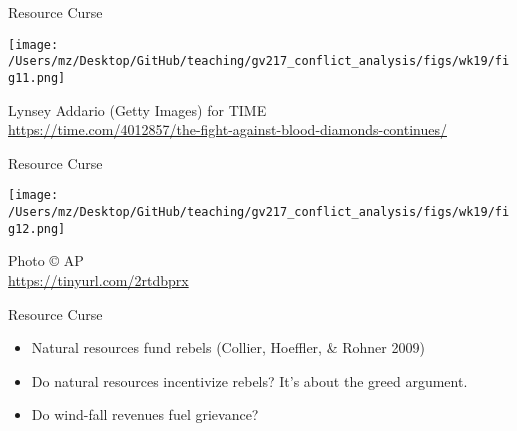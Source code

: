 \documentclass{beamer}
\begin{document}
\begin{frame}{Resource Curse}
    \pause
    \begin{center}
        \texttt{[image: /Users/mz/Desktop/GitHub/teaching/gv217\_conflict\_analysis/figs/wk19/fig11.png]}
    \end{center}
    \tiny Lynsey Addario (Getty Images) for TIME\\ \url{https://time.com/4012857/the-fight-against-blood-diamonds-continues/}
\end{frame}

\begin{frame}{Resource Curse}
    \pause
    \begin{center}
        \texttt{[image: /Users/mz/Desktop/GitHub/teaching/gv217\_conflict\_analysis/figs/wk19/fig12.png]}
    \end{center}
    \tiny Photo © AP\\ \url{https://tinyurl.com/2rtdbprx}
\end{frame}

\begin{frame}{Resource Curse}
    \begin{itemize}
        \pause\item Natural resources fund rebels (Collier, Hoeffler, \& Rohner 2009)
        \pause\item Do natural resources incentivize rebels? It's about the greed argument.
        \pause\item Do wind-fall revenues fuel grievance?
    \end{itemize}
\end{frame}
\end{document}
